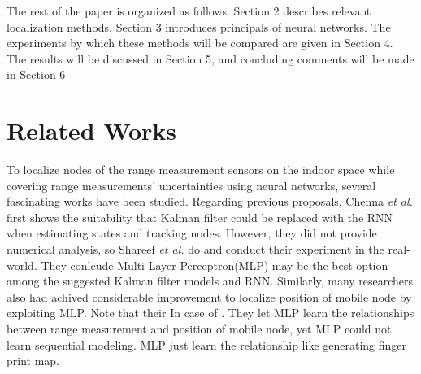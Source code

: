 \documentclass{ieeeaccess}
\begin{document}
The rest of the paper is organized as follows. Section 2 describes relevant localization methods. Section 3 introduces
principals of neural networks. The experiments by which
these methods will be compared are given in Section 4. The
results will be discussed in Section 5, and concluding comments will be made in Section 6

\section{Related Works}

 To localize nodes of the range measurement sensors on the indoor space while covering range measurements' uncertainties using neural networks, several fascinating works have been studied. Regarding previous proposals, Chenna \textit{et al.} first shows the suitability that Kalman filter could be replaced with the RNN when estimating states and tracking nodes\cite{chenna2004state}. However, they did not provide numerical analysis, so Shareef \textit{et al.} do\cite{shareef2008localization} and conduct their experiment in the real-world. They conlcude Multi-Layer Perceptron(MLP) may be the best option among the suggested Kalman filter models and RNN. Similarly, many researchers also had achived considerable improvement to localize position of mobile node by exploiting MLP\cite{rahman2009localization, singh2013tdoa, abdelhadi2013efficient}. Note that their In case of \cite{shareef2008localization}. They let MLP learn the relationships between range measurement and position of mobile node, yet MLP could not learn sequential modeling. MLP just learn the relationship like generating finger print map. 
 
 
 
 
\end{document}
